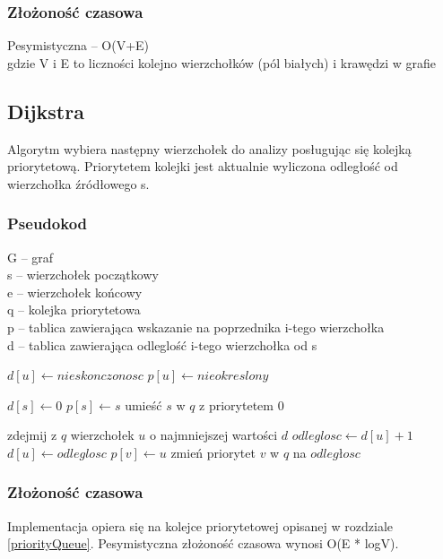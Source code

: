 \documentclass[11pt,a4paper]{article}
\begin{document}
\subsubsection{Złożoność czasowa}
Pesymistyczna – O(V+E)\\
gdzie V i E to liczności kolejno wierzchołków (pól białych) i krawędzi w grafie

\subsection{Dijkstra}
Algorytm wybiera następny wierzchołek do analizy posługując się kolejką priorytetową. Priorytetem kolejki jest aktualnie wyliczona odległość od wierzchołka źródłowego s.

\subsubsection{Pseudokod}
G – graf\\
s – wierzchołek początkowy\\
e – wierzchołek końcowy\\
q – kolejka priorytetowa\\
p – tablica zawierająca wskazanie na poprzednika i-tego wierzchołka\\
d – tablica zawierająca odleglość i-tego wierzchołka od s\\
\begin{algorithmic}
   	\State $d[u]\gets nieskonczonosc$
   	\State $p[u]\gets nieokreslony$
   \EndFor
   
   \State $d[s]\gets 0$
   \State $p[s]\gets s$
   \State umieść $s$ w $q$ z priorytetem 0
   
   	\State zdejmij z $q$ wierzchołek $u$ o najmniejszej wartości $d$
   	 \Return
   	\EndIf
   		\State $odleglosc\gets d[u]+1$
   			\State $d[u]\gets odleglosc$
   			\State $p[v]\gets u$
   			\State zmień priorytet $v$ w $q$ na $odległosc$
   		\EndIf
   \EndFor
   \EndWhile
\EndFunction
\end{algorithmic}

\subsubsection{Złożoność czasowa}
Implementacja opiera się na kolejce priorytetowej opisanej w rozdziale \ref{priorityQueue}.
Pesymistyczna złożoność czasowa wynosi O(E * logV).
\end{document}
